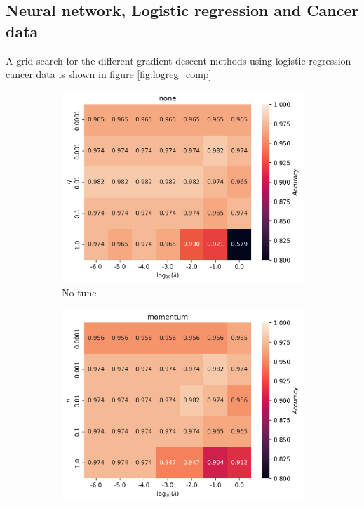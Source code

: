 \documentclass[11pt]{article}
\begin{document}
\subsection{Neural network, Logistic regression and Cancer data}
A grid search for the different gradient descent methods using logistic regression cancer data is shown in figure \ref{fig:logreg_comp}
\begin{figure}[H]
    \begin{subfigure}{.5\textwidth}
        \centering
        \includegraphics[width=.95\textwidth]{../figures/logreg_none.png}
        \caption{No tune}
        \label{fig:}
    \end{subfigure}
    \begin{subfigure}{.5\textwidth}
        \centering
        \includegraphics[width=.95\textwidth]{../figures/logreg_momentum.png}

\end{subfigure}
\end{figure}
\end{document}
